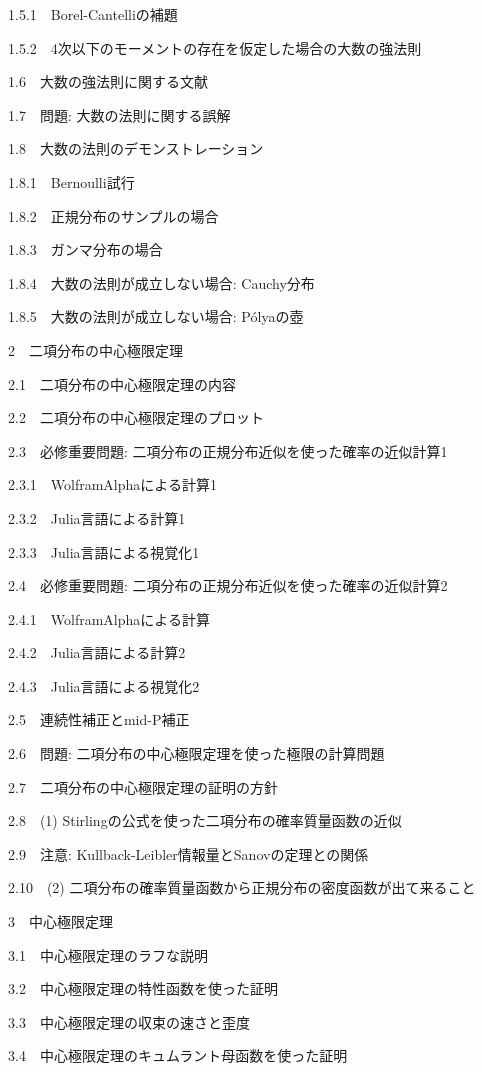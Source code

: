 \documentclass[10pt, a4paper,xelatex,ja=standard]{bxjsarticle}
\begin{document}
{{1.5.1~~}Borel-Cantelliの補題}

{{1.5.2~~}4次以下のモーメントの存在を仮定した場合の大数の強法則}

{{1.6~~}大数の強法則に関する文献}

{{1.7~~}問題: 大数の法則に関する誤解}

{{1.8~~}大数の法則のデモンストレーション}

{{1.8.1~~}Bernoulli試行}

{{1.8.2~~}正規分布のサンプルの場合}

{{1.8.3~~}ガンマ分布の場合}

{{1.8.4~~}大数の法則が成立しない場合: Cauchy分布}

{{1.8.5~~}大数の法則が成立しない場合: Pólyaの壺}

{{2~~}二項分布の中心極限定理}

{{2.1~~}二項分布の中心極限定理の内容}

{{2.2~~}二項分布の中心極限定理のプロット}

{{2.3~~}必修重要問題: 二項分布の正規分布近似を使った確率の近似計算1}

{{2.3.1~~}WolframAlphaによる計算1}

{{2.3.2~~}Julia言語による計算1}

{{2.3.3~~}Julia言語による視覚化1}

{{2.4~~}必修重要問題: 二項分布の正規分布近似を使った確率の近似計算2}

{{2.4.1~~}WolframAlphaによる計算}

{{2.4.2~~}Julia言語による計算2}

{{2.4.3~~}Julia言語による視覚化2}

{{2.5~~}連続性補正とmid-P補正}

{{2.6~~}問題: 二項分布の中心極限定理を使った極限の計算問題}

{{2.7~~}二項分布の中心極限定理の証明の方針}

{{2.8~~}(1) Stirlingの公式を使った二項分布の確率質量函数の近似}

{{2.9~~}注意: Kullback-Leibler情報量とSanovの定理との関係}

{{2.10~~}(2) 二項分布の確率質量函数から正規分布の密度函数が出て来ること}

{{3~~}中心極限定理}

{{3.1~~}中心極限定理のラフな説明}

{{3.2~~}中心極限定理の特性函数を使った証明}

{{3.3~~}中心極限定理の収束の速さと歪度}

{{3.4~~}中心極限定理のキュムラント母函数を使った証明}
\end{document}
